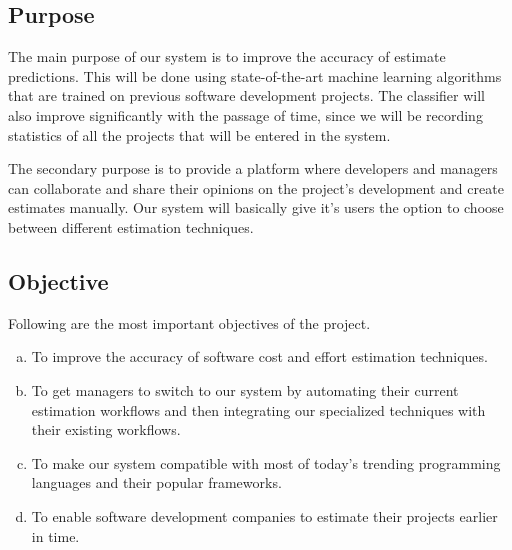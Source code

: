 \subsection{Purpose}
The main purpose of our system is to improve the accuracy of estimate predictions. This will be done using state-of-the-art machine learning algorithms that are trained on previous software development projects. The classifier will also improve significantly with the passage of time, since we will be recording statistics of all the projects that will be entered in the system. 

 The secondary purpose is to provide a platform where developers and managers can collaborate and share their opinions on the project's development and create estimates manually. Our system will basically give it's users the option to choose between different estimation techniques.












\subsection{Objective}
Following are the most important objectives of the project.
\begin{enumerate}[(a)]
	\item To improve the accuracy of software cost and effort estimation techniques.
	\item To get managers to switch to our system by automating their current estimation workflows and then  integrating our specialized techniques with their existing workflows.
	\item To make our system compatible with most of today's trending programming languages and their popular frameworks.
	\item To enable software development companies to estimate their projects earlier in time.
\end{enumerate}













